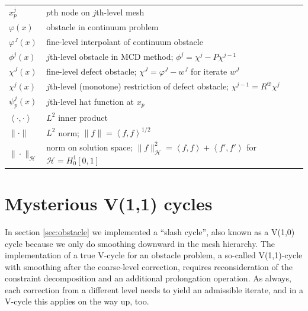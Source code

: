 \documentclass[letterpaper,final,12pt,reqno]{amsart}
\theoremstyle{claim}
\newcommand{\ip}[2]{\left<#1,#2\right>}
\newcommand{\mR}{R^{\bm{\oplus}}}
\numberwithin{equation}{section}
\numberwithin{figure}{section}
\numberwithin{table}{section}
\numberwithin{theorem}{section}
\begin{document}
\begin{longtable}{l|l}
$x_p^j$ & $p$th node on $j$th-level mesh \\
$\varphi(x)$ & obstacle in continuum problem \\
$\varphi^J(x)$ & fine-level interpolant of continuum obstacle \\
$\phi^j(x)$ & $j$th-level obstacle in MCD method; $\phi^j=\chi^j - P\chi^{j-1}$ \\
$\chi^J(x)$ & fine-level defect obstacle; $\chi^J = \varphi^J - w^J$ for iterate $w^J$ \\
$\chi^j(x)$ & $j$th-level (monotone) restriction of defect obstacle; $\chi^{j-1} = \mR \chi^j$ \\
$\psi_p^j(x)$ & $j$th-level hat function at $x_p$ \\
$\ip{\cdot}{\cdot}$ & $L^2$ inner product \\
$\|\cdot\|$ & $L^2$ norm; $\|f\|=\ip{f}{f}^{1/2}$ \\
$\|\cdot\|_{\mathcal{H}}$ & norm on solution space; $\|f\|_{\mathcal{H}}^2 =\ip{f}{f} + \ip{f'}{f'}$ for $\mathcal{H}=H_0^1[0,1]$
\end{longtable}


\section{Mysterious V(1,1) cycles}  In section \ref{sec:obstacle} we implemented a ``slash cycle'', also known as a V(1,0) cycle because we only do smoothing downward in the mesh hierarchy.  The implementation of a true V-cycle for an obstacle problem, a so-called V(1,1)-cycle \cite{GraeserKornhuber2009} with smoothing after the coarse-level correction, requires reconsideration of the constraint decomposition and an additional prolongation operation.  As always, each correction from a different level needs to yield an admissible iterate, and in a V-cycle this applies on the way up, too.
\end{document}
